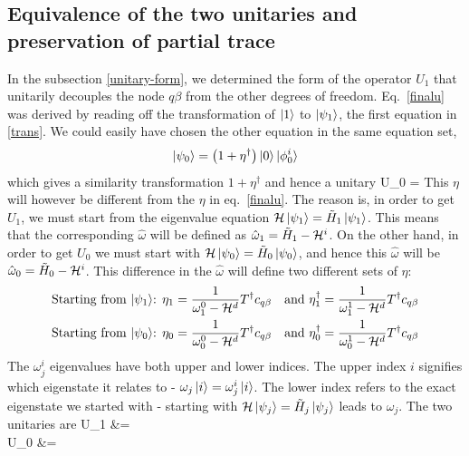 \documentclass[12pt,twoside]{article}
\numberwithin{equation}{section}
\begin{document}
\subsection{Equivalence of the two unitaries and preservation of partial trace}
In the subsection \ref{unitary-form}, we determined the form of the operator \(U_1\) that unitarily decouples the node \(q\beta\) from the other degrees of freedom. Eq.~\ref{finalu} was derived by reading off the transformation of \(\ket{1}\) to \(\ket{\psi_1}\), the first equation in \ref{trans}. We could easily have chosen the other equation in the same equation set,
\begin{gather*}
\ket{\psi_0} = \left({1 + {\eta}^\dagger}\right)\ket{0}\ket{\phi_0^i}
\end{gather*}
which gives a similarity  transformation \(1+\eta^\dagger\) and hence a unitary
\beq
U_0 = 
\eeq
This \(\eta\) will however be different from the \(\eta\) in eq.~\ref{finalu}. The reason is, in order to get \(U_1\), we must start from the eigenvalue equation \(\mathcal{H} \ket{\psi_1} = \tilde H_1 \ket{\psi_1}\). This means that the corresponding \(\hat \omega\) will be defined as \(\hat \omega_1 = \tilde H_1 - \mathcal{H}^i\). On the other hand, in order to get \(U_0\) we must start with \(\mathcal{H} \ket{\psi_0} = \tilde H_0 \ket{\psi_0}\), and hence this \(\hat \omega\) will be \(\hat \omega_0 = \tilde H_0 - \mathcal{H}^i\). This difference in the \(\hat \omega\) will define two different sets of \(\eta\):
\begin{equation}\begin{aligned}
	\label{eta0}
\text{Starting from \(\ket{\psi_1}\):	}\eta_1 = \frac{1}{\omega_1^0- \mathcal{H}^d}T^\dagger c_{q\beta} && \text{and }\eta^\dagger_1 = \frac{1}{\omega_1^1- \mathcal{H}^d}T^\dagger c_{q\beta}\\
\text{Starting from \(\ket{\psi_0}\):	}\eta_0 = \frac{1}{\omega_0^0- \mathcal{H}^d}T^\dagger c_{q\beta} && \text{and }\eta^\dagger_0 = \frac{1}{\omega_0^1- \mathcal{H}^d}T^\dagger c_{q\beta}
\end{aligned}\end{equation}
The \(\omega_j^i\) eigenvalues have both upper and lower indices. The upper index \(i\) signifies which eigenstate it relates to - \(\omega_j \ket{i} = \omega_j^i\ket{i}\). The lower index refers to the exact eigenstate we started with - starting with \(\mathcal{H} \ket{\psi_j} = \tilde H_j\ket{\psi_j}\) leads to \(\omega_j\). The two unitaries are
\beq
U_1 &= \\
U_0 &= 
\end{document}
